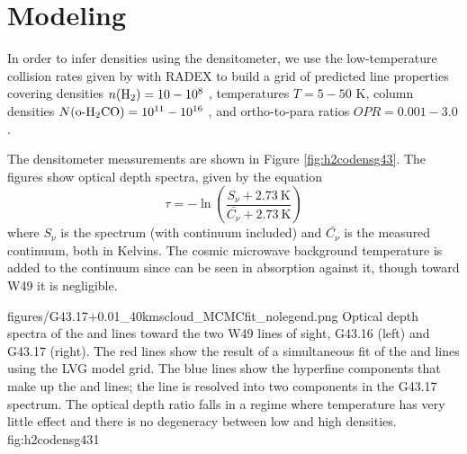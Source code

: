 \section{Modeling \formaldehyde}
In order to infer densities using the \formaldehyde densitometer, we use the
low-temperature collision rates given by \citet{Troscompt2009a} with RADEX
\citep{van-der-Tak2007a} to build a grid of predicted line properties covering
densities $n(\textrm{H}_{2}) = 10-10^8$ \percc, temperatures $T=5-50$ K, column densities
$N(\textrm{o-H}_2\textrm{CO}) = 10^{11}-10^{16}$ \persc, and ortho-to-para ratios 
$OPR = 0.001-3.0$.

The \formaldehyde densitometer measurements are shown in Figure \ref{fig:h2codensg43}.
The figures show optical depth spectra, given by the equation
\begin{equation}
    \tau = -\ln\left(\frac{S_\nu + 2.73\mathrm{~K}}{\bar{C_\nu} + 2.73\mathrm{~K}}\right)
\end{equation}
where $S_\nu$ is the spectrum (with continuum included) and $\bar{C_\nu}$ is
the measured continuum, both in Kelvins.  The cosmic microwave background
temperature is added to the continuum since \formaldehyde can be seen in
absorption against it, though toward W49 it is negligible.

          {figures/G43.17+0.01_40kmscloud_MCMCfit_nolegend.png}
{Optical depth spectra of the \oneone and \twotwo lines toward the two W49
lines of sight, G43.16 (left) and G43.17 (right).  The red lines show the
result of a simultaneous fit of the \ortho \oneone and \twotwo lines using the
LVG model grid.  The blue lines show the hyperfine components that make up the
\oneone and \twotwo lines; the \oneone line is resolved into two components in
the G43.17 spectrum.
The optical depth ratio falls in a regime where temperature has very little
effect and there is no degeneracy between low and high densities.  }
{fig:h2codensg43}{1}

